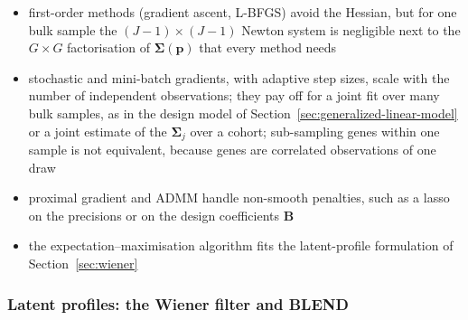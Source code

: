 \begin{itemize}
  \item first-order methods (gradient ascent, L-BFGS) avoid the Hessian, but for one bulk sample the
        \((J-1)\times(J-1)\) Newton system is negligible next to the \(G\times G\) factorisation of \(\boldsymbol{\Sigma}(\boldsymbol{p})\) that
        every method needs
  \item stochastic and mini-batch gradients, with adaptive step sizes, scale with the number of
        independent observations; they pay off for a joint fit over many bulk samples, as in the design model of
        Section~\ref{sec:generalized-linear-model} or a joint estimate of the \(\boldsymbol{\Sigma}_{j}\) over a cohort; sub-sampling
        genes within one sample is not equivalent, because genes are correlated observations of one draw
  \item proximal gradient and ADMM handle non-smooth penalties, such as a lasso on the precisions or on the
        design coefficients \(\boldsymbol{B}\)
  \item the expectation--maximisation algorithm fits the latent-profile formulation of Section~\ref{sec:wiener}
        \cite{dempsterMaximumLikelihoodIncomplete1977}
\end{itemize}

\subsubsection{Latent profiles: the Wiener filter and BLEND}
\label{app:wiener-blend}

